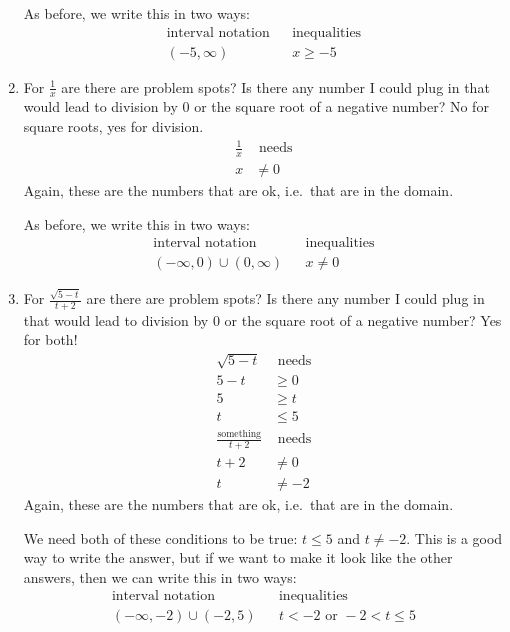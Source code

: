 \documentclass[oneside]{book}
\theoremstyle{definition}
\theoremstyle{solution}
\newtheorem*{solution}{Solution}
\newenvironment{solution}{\vspace{2in}\comment}{\endcomment}
\begin{document}
\begin{solution}
\begin{enumerate}
As before, we write this in two ways:
$$
\begin{array}{ccc}
\text{interval notation} & & \text{inequalities}\\
(-5,\infty) &&  x \ge -5
\end{array}
$$

\item For $\frac 1x$ are there are problem spots?  Is there any number
  I could plug in that would lead to division by $0$ or the square
  root of a negative number?  No for square roots, yes for division.
\begin{align*}
\frac 1x & \text{ needs}\\
x & \ne 0
\end{align*}
Again, these are the numbers that are ok, i.e.\ that are in the domain. 

As before, we write this in two ways:
$$
\begin{array}{ccc}
\text{interval notation} & & \text{inequalities}\\
(-\infty,0)\cup (0,\infty) && x \ne 0
\end{array}
$$

\item For $\frac {\sqrt{5-t}}{t+2}$ are there are problem spots?  Is
  there any number I could plug in that would lead to division by $0$
  or the square root of a negative number?  Yes for both!
\begin{align*}
\sqrt{5-t} & \text{ needs}\\
5-t  & \ge 0\\
5 & \ge t\\
t & \le 5\\
\frac{\text{something}}{t+2} & \text{ needs}\\
t+2 & \ne 0\\
t & \ne -2
\end{align*}
Again, these are the numbers that are ok, i.e.\ that are in the domain. 

We need both of these conditions to be true: $t\le 5$ and $t\ne -2$.
This is a good way to write the answer, but if we want to make it look
like the other answers, then we can write this in two ways:
$$
\begin{array}{ccc}
\text{interval notation} & & \text{inequalities}\\
(-\infty,-2)\cup (-2,5) &  & t <-2 \text{ or }-2 < t \le 5
\end{array}
$$
\end{enumerate}
\end{solution}
\end{document}
